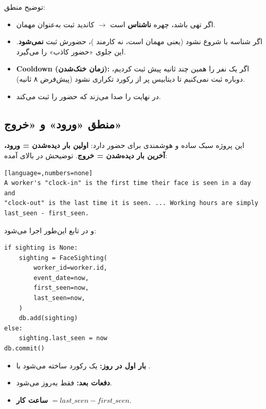 \documentclass[12pt,a4paper]{article}
\begin{document}
توضیح منطق:
\begin{itemize}[rightmargin=0pt]
  \item اگر  تهی باشد، چهره \textbf{ناشناس} است $\rightarrow$ کاندید ثبت به‌عنوان مهمان.
  \item اگر شناسه با  شروع نشود (یعنی مهمان است، نه کارمند )، حضورش ثبت \textbf{نمی‌شود}. این جلوی «حضور کاذب» را می‌گیرد.
  \item \textbf{Cooldown (زمان خنک‌شدن):} اگر یک نفر را همین چند ثانیه پیش ثبت کردیم، دوباره ثبت نمی‌کنیم تا دیتابیس پر از رکورد تکراری نشود (پیش‌فرض ۸ ثانیه).
  \item در نهایت  را صدا می‌زند که حضور را ثبت می‌کند.
\end{itemize}

\subsection{منطق «ورود» و «خروج»}
این پروژه سبک ساده و هوشمندی برای حضور دارد: \textbf{اولین بار دیده‌شدن = ورود، آخرین بار دیده‌شدن = خروج}. توضیحش در بالای  آمده:

\begin{latin}
\begin{lstlisting}[language=,numbers=none]
A worker's "clock-in" is the first time their face is seen in a day and
"clock-out" is the last time it is seen. ... Working hours are simply
last_seen - first_seen.
\end{lstlisting}
\end{latin}

و در تابع  این‌طور اجرا می‌شود:

\begin{latin}
\begin{lstlisting}
if sighting is None:
    sighting = FaceSighting(
        worker_id=worker.id,
        event_date=now,
        first_seen=now,
        last_seen=now,
    )
    db.add(sighting)
else:
    sighting.last_seen = now
db.commit()
\end{lstlisting}
\end{latin}

\begin{itemize}[rightmargin=0pt]
  \item \textbf{بار اول در روز:} یک رکورد  ساخته می‌شود با .
  \item \textbf{دفعات بعد:} فقط  به‌روز می‌شود.
  \item \textbf{ساعت کار} $= last\_seen - first\_seen$.
\end{itemize}
\end{document}
